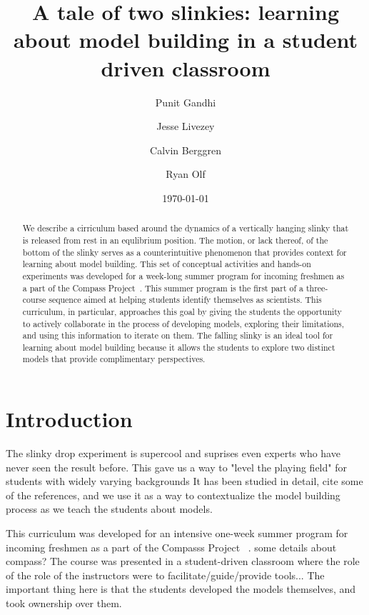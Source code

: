 \documentclass[aps,pre,10pt,superscriptaddress,showpacs,amsmath,amssymb,nofootinbib]{revtex4-1}
\begin{document}
\title{A tale of two slinkies: learning about model building in a student driven classroom }
\author{Punit  Gandhi}
\author{Jesse Livezey}
\author{Calvin Berggren}
\author{Ryan Olf}
\date{\today}

\begin{abstract}
We describe a cirriculum based around the dynamics of a vertically hanging slinky that is released from rest in an equlibrium position.
The motion, or lack thereof, of the bottom of the slinky serves as a counterintuitive phenomenon that provides context for learning about model building.
This set of conceptual activities and hands-on experiments was developed for a week-long summer program for incoming freshmen as a part of the Compass Project~\cite{albana2013}.  
This summer program is the first part of a three-course sequence aimed at helping students identify themselves as scientists.  
This curriculum, in particular, approaches this goal by giving the students the opportunity to actively collaborate in the process of developing models, exploring their limitations, and using this information to iterate on them.  
The falling slinky is an ideal tool for learning about model building because it allows the students to explore two distinct models that provide complimentary perspectives.
\end{abstract}

\maketitle

\section{Introduction}


The slinky drop experiment is supercool and suprises even experts who have never
seen the result before.  This gave us a way to "level the playing field" for
students with widely varying backgrounds    It has been studied in detail, cite
some of the references, and we use it as a way to contextualize the model
building process as we teach the students about models.

This curriculum was developed for an intensive one-week summer program for
incoming freshmen as a part of the Compasss Project ~\cite{albana2013}. some
details about compass?  The course was presented in a student-driven classroom
where the role of the role of the instructors were to facilitate/guide/provide
tools...  The important thing here is that the students developed the models
themselves, and took ownership over them.
\end{document}
